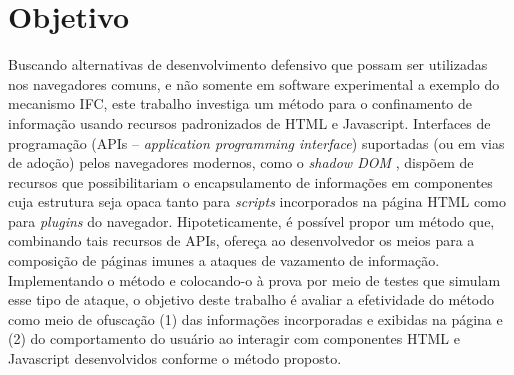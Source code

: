 \section{Objetivo}



Buscando alternativas de desenvolvimento defensivo que possam ser utilizadas nos navegadores comuns, e não somente em software experimental a exemplo do mecanismo IFC, este trabalho investiga um método para o confinamento de informação usando recursos padronizados de HTML e Javascript. Interfaces de programação (APIs -- \textit{application programming interface}) suportadas (ou em vias de adoção) pelos navegadores modernos, como o \textit{shadow DOM} \cite{W3C:ShadowDOM}, dispõem de recursos que possibilitariam o encapsulamento de informações em componentes cuja estrutura seja opaca tanto para \textit{scripts} incorporados na página HTML como para \textit{plugins} do navegador. Hipoteticamente, é possível propor um método que, combinando tais recursos de APIs, ofereça ao desenvolvedor os meios para a composição de páginas imunes a ataques de vazamento de informação. Implementando o método e colocando-o à prova por meio de testes que simulam esse tipo de ataque, o objetivo deste trabalho é avaliar a efetividade do método como meio de ofuscação (1) das informações incorporadas e exibidas na página e (2) do comportamento do usuário ao interagir com componentes HTML e Javascript desenvolvidos conforme o método proposto.